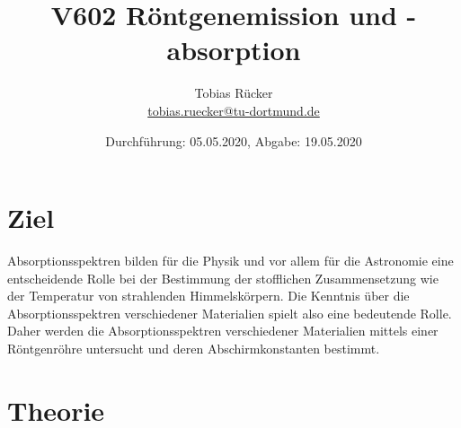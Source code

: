 


    \title{V602 Röntgenemission und -absorption}
    \author{  
    Tobias Rücker\\
    \texorpdfstring{\href{mailto:tobias.ruecker@tu-dortmund.de}{tobias.ruecker@tu-dortmund.de}
    }{}}
    \date{Durchführung: 05.05.2020, Abgabe: 19.05.2020 \vspace{-4ex}}
\maketitle
\thispagestyle{empty}

\newpage
\tableofcontents
\thispagestyle{empty}
\newpage


\setcounter{page}{1}
\section{Ziel}\justifying
Absorptionsspektren bilden für die Physik und vor allem für die Astronomie eine entscheidende Rolle
bei der Bestimmung der stofflichen Zusammensetzung wie der Temperatur von strahlenden Himmelskörpern.
Die Kenntnis über die Absorptionsspektren verschiedener Materialien spielt also eine bedeutende
Rolle. Daher werden die Absorptionsspektren verschiedener Materialien mittels einer Röntgenröhre 
untersucht und deren Abschirmkonstanten bestimmt. 



\section{Theorie}\justifying

